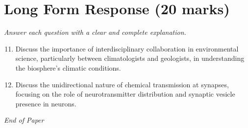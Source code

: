 \documentclass[12pt]{article}
\begin{document}
\section*{Long Form Response (20 marks)}
\textit{Answer each question with a clear and complete explanation.}
\begin{enumerate}[label=\arabic*.]
\setcounter{enumi}{10}
\item Discuss the importance of interdisciplinary collaboration in environmental science, particularly between climatologists and geologists, in understanding the biosphere's climatic conditions.
\item Discuss the unidirectional nature of chemical transmission at synapses, focusing on the role of neurotransmitter distribution and synaptic vesicle presence in neurons.
\end{enumerate}

\vfill
\noindent\textit{End of Paper}
\end{document}
